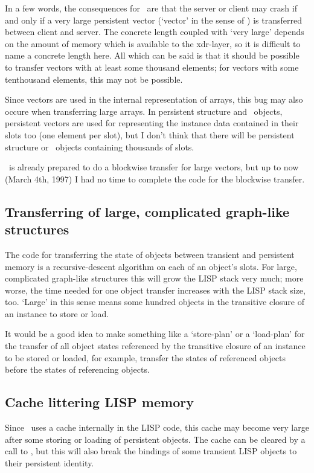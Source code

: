 In a few words, the consequences for \plob\ are that the server or
client may crash if and only if a very large persistent vector
(`vector' in the sense of \cl) is transferred between client and
server. The concrete length coupled with `very large' depends on the
amount of memory which is available to the xdr-layer, so it is
difficult to name a concrete length here. All which can be said is
that it should be possible to transfer vectors with at least some
thousand elements; for vectors with some tenthousand elements, this
may not be possible.

Since vectors are used in the internal representation of arrays,
this bug may also occure when transferring large arrays. In persistent
structure and \clos\ objects, persistent vectors are used for
representing the instance data contained in their slots too (one
element per slot), but I don't think that there will be persistent
structure or \clos\ objects containing thousands of slots.

\plob\ is already prepared to do a blockwise transfer for
large vectors, but up to now (March 4th, 1997) I had no time to
complete the code for the blockwise transfer.

\subsection{Transferring of large, complicated graph-like structures}

The code for transferring the state of objects between
transient and persistent memory is a recursive-descent algorithm on
each of an object's slots. For large, complicated graph-like
structures this will grow the LISP stack very much; more worse, the
time needed for one object transfer increases with the LISP stack
size, too. `Large' in this sense means some hundred objects in the
transitive closure of an instance to store or load.

It would be a good idea to make something like a `store-plan' or a
`load-plan' for the transfer of all object states referenced by the
transitive closure of an instance to be stored or loaded, for example,
transfer the states of referenced objects before the states of
referencing objects.

\subsection{Cache littering LISP memory}%
\label{sec:CacheLitteringMemory}

Since \plob\ uses a cache internally in the LISP code, this cache may
become very large after some storing or loading of persistent objects.
The cache can be cleared by a call to , but this
will also break the bindings of some transient LISP objects to their
persistent identity.

